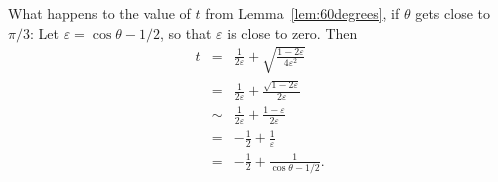 \pdfoutput=1  \documentclass[11pt]{article}
\begin{document}
What happens to the value of $t$ from Lemma~\ref{lem:60degrees},
if $\theta$ gets close to $\pi/3$:
Let $\varepsilon = \cos \theta - 1/2$, so that $\varepsilon$ is close to zero.
Then
\begin{eqnarray*}
 t & = & \frac{1}{2 \varepsilon} +
         \sqrt{ \frac{1 - 2 \varepsilon}{4 \varepsilon^2} } \\
   & = & \frac{1}{2 \varepsilon} +
         \frac{\sqrt{1 - 2 \varepsilon}}{2 \varepsilon}  \\
   & \sim & \frac{1}{2 \varepsilon} + \frac{1 - \varepsilon}{2 \varepsilon} \\
   & = & - \frac{1}{2} + \frac{1}{\varepsilon} \\
   & = & - \frac{1}{2} + \frac{1}{\cos \theta - 1/2} .
\end{eqnarray*}
\end{document}
